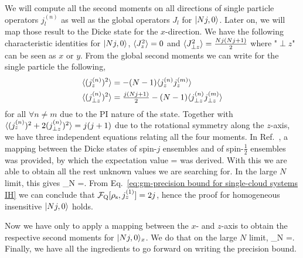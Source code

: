 We will compute all the second moments on all directions of single particle operators $j_l^{(n)}$ as well as the global operators $J_l$ for $\vert{Nj,0}\rangle$.
Later on, we will map those result to the Dicke state for the $x$-direction.
We have the following characteristic identities for $\vert{Nj,0}\rangle$, $\langle{J_z^2}\rangle = 0$ and $\langle{J_{\perp z}^2}\rangle = \frac{Nj(Nj+1)}{2}$ where "${\perp}{z}$" can be seen as $x$ or $y$.
From the global second moments we can write for the single particle the following,
\begin{align}
  \langle{(j_z^{(n)})^2}\rangle &= -(N-1)\langle{j_z^{(n)}j_z^{(m)}}\rangle \\
  \langle{(j_{\perp z}^{(n)})^2}\rangle &= \tfrac{j(Nj+1)}{2}-(N-1)\langle{j_{\perp z}^{(n)}j_{\perp z}^{(m)}}\rangle
\end{align}
for all $\forall n\neq m$ due to the PI nature of the state.
Together with $\langle{(j_z^{(n)})^2+2(j_{\perp z}^{(n)})^2}\rangle = j(j+1)$ due to the rotational symmetry along the $z$-axis, we have three independent equations relating all the four moments.
In Ref.~\cite{Urizar-Lanz2013}, a mapping between the Dicke states of spin-$j$ ensembles and of spin-$\frac{1}{2}$ ensembles was provided, by which the expectation value
\be
  = 
\ee
was derived.
With this we are able to obtain all the rest unknown values we are searching for.
In the large $N$ limit, this gives
\be
\label{eq:gm-jz2 for dicke state large number of particles}
\lim_{N \to \infty} =.
\ee
From Eq.~\eqref{eq:gm-precision bound for single-cloud
systems IH} we can conclude that $\mathcal{F}_{\textnormal{Q}}[{\textstyle \rho_{\text{s}},j_z^{(1)}}]=2j$,
hence the proof for homogeneous insensitive $\vert{Nj,0}\rangle$ holds.

Now we have only to apply a mapping between the $x$- and $z$-axis to obtain the respective second moments for $\vert{Nj,0}\rangle_{x}$.
We do that on the large $N$ limit,
\be
  \lim_{N \to \infty} =.
\ee
Finally, we have all the ingredients to go forward on writing the precision bound.

